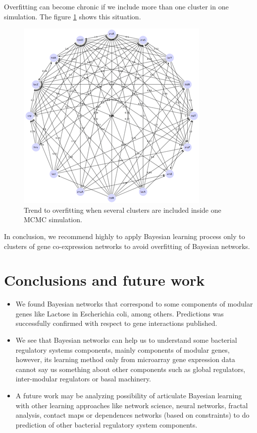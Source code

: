 \documentclass{bmcart}
\begin{document}
Overfitting can become chronic if we include more than one cluster in one simulation. The figure \ref{fig:wn_overfit} shows this situation.
\begin{figure}
\includegraphics[scale=2.5]{images/wn-overfit_Ecoli} \centering
\caption{Trend to overfitting when several clusters are included inside one
MCMC simulation.}
\label{fig:wn_overfit} 
\end{figure}
In conclusion, we recommend highly to apply Bayesian learning process only to clusters of gene co-expression networks to avoid overfitting of Bayesian networks. 

\section*{Conclusions and future work}
\begin{itemize}
\item We found Bayesian networks that correspond to some components of modular genes like Lactose in Escherichia coli, among others. Predictions was successfully confirmed with respect to gene interactions published.
\item We see that Bayesian networks can help us to understand some bacterial regulatory systems components, mainly components of modular genes, however, its learning method only from microarray gene expression data cannot say us something about other components such as global regulators, inter-modular regulators or basal machinery.
\item A future work may be analyzing possibility of articulate Bayesian learning with other learning approaches like network science, neural networks, fractal analysis, contact maps or dependences networks (based on constraints) to do prediction of other bacterial regulatory system components. 
\end{itemize}
\pagebreak
\end{document}
